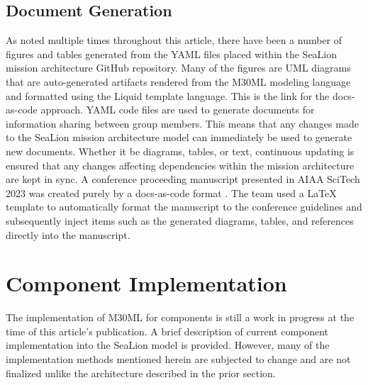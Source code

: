 \documentclass[journal,article,submit,pdftex,moreauthors]{Definitions/mdpi}
\begin{document}
\subsection{Document Generation}
As noted multiple times throughout this article, there have been a number of figures and tables generated from the YAML files placed within the SeaLion mission architecture GitHub repository.  Many of the figures are UML diagrams that are auto-generated artifacts rendered from the M30ML modeling language and formatted using the Liquid template language.  This is the link for the docs-as-code approach.  YAML code files are used to generate documents for information sharing between group members.  This means that any changes made to the SeaLion mission architecture model can immediately be used to generate new documents.  Whether it be diagrams, tables, or text, continuous updating is ensured that any changes affecting dependencies within the mission architecture are kept in sync.  A conference proceeding manuscript presented in AIAA SciTech 2023 was created purely by a docs-as-code format \cite{scitech_proceeding}.  The team used a LaTeX template to automatically format the manuscript to the conference guidelines and subsequently inject items such as the generated diagrams, tables, and references directly into the manuscript.

\section{Component Implementation}
The implementation of M30ML for components is still a work in progress at the time of this article's publication.  A brief description of current component implementation into the SeaLion model is provided.  However, many of the implementation methods mentioned herein are subjected to change and are not finalized unlike the architecture described in the prior section.
\end{document}

